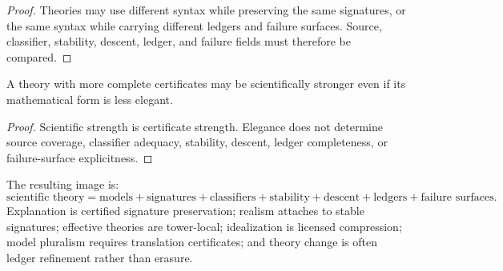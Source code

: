 \begin{proof}
Theories may use different syntax while preserving the same signatures, or the same syntax while carrying different ledgers and failure surfaces. Source, classifier, stability, descent, ledger, and failure fields must therefore be compared.
\end{proof}

\begin{corollary}
\label{cor:stronger-theory-less-elegant}
A theory with more complete certificates may be scientifically stronger even if its mathematical form is less elegant.
\end{corollary}

\begin{proof}
Scientific strength is certificate strength. Elegance does not determine source coverage, classifier adequacy, stability, descent, ledger completeness, or failure-surface explicitness.
\end{proof}

\begin{remark}
\label{rem:scientific-methodology-compressed-form}
The resulting image is:
$$
\text{scientific theory}
=
\text{models}
+
\text{signatures}
+
\text{classifiers}
+
\text{stability}
+
\text{descent}
+
\text{ledgers}
+
\text{failure surfaces}.
$$
Explanation is certified signature preservation; realism attaches to stable signatures; effective theories are tower-local; idealization is licensed compression; model pluralism requires translation certificates; and theory change is often ledger refinement rather than erasure.
\end{remark}


